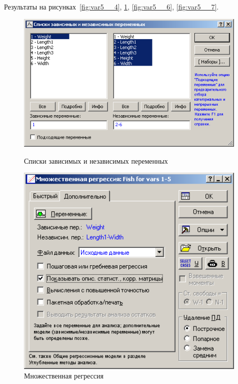 Результаты на рисунках~\ref{fig:var5__4}, \ref{fig:var5__5}, \ref{fig:var5__6}, \ref{fig:var5__7}.

\begin{figure}[!h]
  \centering
  \begin{minipage}{0.49\textwidth}
    \centering

    \includegraphics[width=0.99\textwidth]
    {inc/var5__4.PNG}

    \caption{Списки зависимых и независимых переменных}
    \label{fig:var5__4}
  \end{minipage}
  \begin{minipage}{0.49\textwidth}
    \centering

    \includegraphics[width=0.99\textwidth]
    {inc/var5__5.PNG}

    \caption{Множественная регрессия}
    \label{fig:var5__5}
  \end{minipage}
\end{figure}

